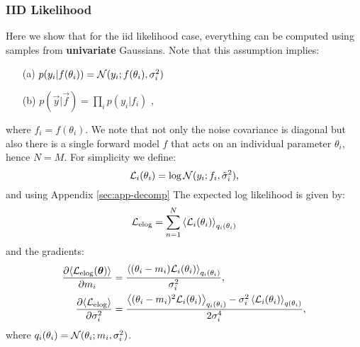 \subsubsection{IID Likelihood}
Here we show that for the iid likelihood case, everything can be computed using samples from \textbf{univariate} Gaussians. Note 
that this assumption implies:
\begin{itemize}
\item[(a)]
$p(y_{i} | f(\theta_{i})) = \mathcal{N}(y_{i}; f(\theta_{i}), \sigma_{i}^{2})$
\item[(b)]
$p(\vec{y} | \vec{f}) = \prod_{i} p(y_{i} | f_{i})$ {,}
\end{itemize}
where $f_{i} = f(\theta_{i})$. We note that not only the noise covariance is diagonal but also there is a single forward model $f$ that acts on an individual parameter $\theta_{i}$, hence $N=M$.
For simplicity we define:
\begin{equation}
	\mathcal{L}_{i}(\theta_{i}) = \log \mathcal{N}(y_{i}; f_{i}, \tilde{\sigma}_{i}^{2}) \text{,}
\end{equation}
and using Appendix \ref{sec:app-decomp} 
The expected log likelihood is given by:
\begin{equation}
\mathcal{L}_{\text{{elog}}} = \sum_{n=1}^{N} \left\langle  \mathcal{L}_{i}(\theta_{i})  \right\rangle_{q_{i}(\theta_{i})}
\end{equation}
%
and the gradients:
\begin{align}
	\frac{\partial{ \left\langle \mathcal{L}_{\text{{elog}}}(\boldsymbol{ \theta } ) \right\rangle}}{\partial{m_{i}}} &= \frac{ \left\langle (\theta_{i} - m_{i}) \mathcal{L}_{i}(\theta_{i}) \right\rangle_{q_{i}(\theta_{i})}}{\sigma_{i}^{2}}   \text{,} \\ 
\frac{\partial{\left\langle \mathcal{L}_{\text{{elog}}}\right\rangle}}{\partial{\sigma_{i}^{2}}} &= 
	\frac{   \left\langle (\theta_{i}-m_{i})^{2} \mathcal{L}_{i}(\theta_{i})  \right\rangle_{q_{i}(\theta_{i})}  - \sigma_{i}^{2} \left\langle \mathcal{L}_{i}(\theta_{i}) \right\rangle_{q(\theta_{i})}   }    {2 \sigma_{i}^{4}} \text{,}
\end{align}
where $q_{i}(\theta_{i}) = \mathcal{N}(\theta_{i}; m_{i}, \sigma_{i}^{2})$.
%
%
